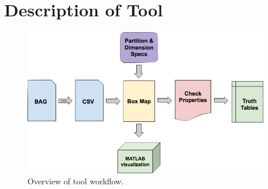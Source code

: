 \section{Description of Tool}
\label{sec:tool}

\begin{figure}[ht]
  \centering
  \includegraphics[width=0.95\textwidth]{./figures/workflow}
  \caption{Overview of tool workflow.}
  \label{fig:workflow}
\end{figure}

